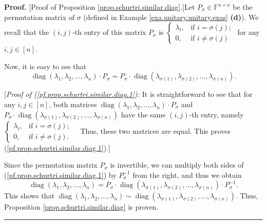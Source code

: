 \documentclass[numbers=enddot,12pt,final,onecolumn,notitlepage]{scrartcl}%
\numberwithin{exer}{subsection}
\theoremstyle{definition}
\newenvironment{proof}[1][Proof]{\noindent\textbf{#1.} }{\ \rule{0.5em}{0.5em}}
\begin{document}
\begin{proof}
[Proof of Proposition \ref{prop.schurtri.similar.diag}.]Let $P_{\sigma}%
\in\mathbb{F}^{n\times n}$ be the permutation matrix of $\sigma$ (defined in
Example \ref{exa.unitary.unitary.exas} \textbf{(d)}). We recall that the
$\left(  i,j\right)  $-th entry of this matrix $P_{\sigma}$ is $%
\begin{cases}
\lambda_{i}, & \text{if }i=\sigma\left(  j\right)  ;\\
0, & \text{if }i\neq\sigma\left(  j\right)
\end{cases}
$ for any $i,j\in\left[  n\right]  $.

Now, it is easy to see that%
\begin{equation}
\operatorname*{diag}\left(  \lambda_{1},\lambda_{2},\ldots,\lambda_{n}\right)
\cdot P_{\sigma}=P_{\sigma}\cdot\operatorname*{diag}\left(  \lambda
_{\sigma\left(  1\right)  },\lambda_{\sigma\left(  2\right)  },\ldots
,\lambda_{\sigma\left(  n\right)  }\right)  .
\label{pf.prop.schurtri.similar.diag.1}%
\end{equation}


[\textit{Proof of (\ref{pf.prop.schurtri.similar.diag.1}):} It is
straightforward to see that for any $i,j\in\left[  n\right]  $, both matrices
$\operatorname*{diag}\left(  \lambda_{1},\lambda_{2},\ldots,\lambda
_{n}\right)  \cdot P_{\sigma}$ and $P_{\sigma}\cdot\operatorname*{diag}\left(
\lambda_{\sigma\left(  1\right)  },\lambda_{\sigma\left(  2\right)  }%
,\ldots,\lambda_{\sigma\left(  n\right)  }\right)  $ have the same $\left(
i,j\right)  $-th entry, namely $%
\begin{cases}
\lambda_{i}, & \text{if }i=\sigma\left(  j\right)  ;\\
0, & \text{if }i\neq\sigma\left(  j\right)  .
\end{cases}
$\ \ Thus, these two matrices are equal. This proves
(\ref{pf.prop.schurtri.similar.diag.1}).] \medskip

Since the permutation matrix $P_{\sigma}$ is invertible, we can multiply both
sides of (\ref{pf.prop.schurtri.similar.diag.1}) by $P_{\sigma}^{-1}$ from the
right, and thus we obtain
\[
\operatorname*{diag}\left(  \lambda_{1},\lambda_{2},\ldots,\lambda_{n}\right)
=P_{\sigma}\cdot\operatorname*{diag}\left(  \lambda_{\sigma\left(  1\right)
},\lambda_{\sigma\left(  2\right)  },\ldots,\lambda_{\sigma\left(  n\right)
}\right)  \cdot P_{\sigma}^{-1}.
\]
This shows that $\operatorname*{diag}\left(  \lambda_{1},\lambda_{2}%
,\ldots,\lambda_{n}\right)  \sim\operatorname*{diag}\left(  \lambda
_{\sigma\left(  1\right)  },\lambda_{\sigma\left(  2\right)  },\ldots
,\lambda_{\sigma\left(  n\right)  }\right)  $. Thus, Proposition
\ref{prop.schurtri.similar.diag} is proven.
\end{proof}
\end{document}

